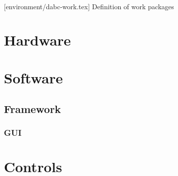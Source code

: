 [environment/dabc-work.tex]
Definition of work packages
\section{Hardware}
\section{Software}
\subsection{Framework}
\subsubsection{GUI}
\section{Controls}
